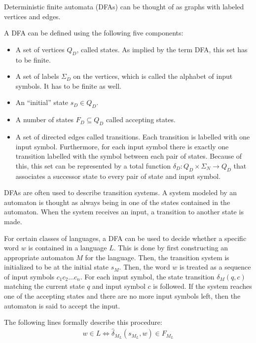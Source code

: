 Deterministic finite automata (DFAs) can be thought of as graphs with labeled vertices and edges.

\begin{definition}
    A DFA can be defined using the following five components:

    \begin{itemize}
        \item A set of vertices $Q_D$, called states.
            As implied by the term DFA, this set has to be finite.
        \item A set of labels $\Sigma_D$ on the vertices,
            which is called the alphabet of input symbols.
            It has to be finite as well.
        \item An ``initial'' state $s_D \in Q_D$.
        \item A number of states $F_D \subseteq Q_D$ called accepting states.
        \item A set of directed edges called transitions.
        Each transition is labelled with one input symbol.
        Furthermore, for each input symbol there is
        exactly one transition labelled with the symbol between each pair of states.
        Because of this, this set can be represented by a total function
        $\delta_D : Q_D \times \Sigma_N \rightarrow Q_D$
        that associates a successor state to every pair of state and input symbol.
    \end{itemize}
\end{definition}

DFAs are often used to describe transition systems.
A system modeled by an automaton is thought as
always being in one of the states contained in the automaton.
When the system receives an input, a transition to another state is made.

For certain classes of languages, a DFA can be used to decide
whether a specific word $w$ is contained in a language $L$.
This is done by first constructing an appropriate automaton $M$ for the language.
Then, the transition system is initialized to be at the initial state $s_{M}$.
Then, the word $w$ is treated as a sequence of input symbols $c_1 c_2 \ldots c_n$.
For each input symbol, the state transition $\delta_{M}(q, c)$
matching the current state $q$ and input symbol $c$ is followed.
If the system reaches one of the accepting states and there are no more input symbols left,
then the automaton is said to accept the input.

The following lines formally describe this procedure:
\begin{align}
    w \in L \Leftrightarrow \hat\delta_{M_L}(s_{M_L}, w) \in F_{M_L}
\end{align}

